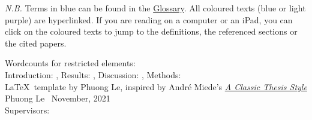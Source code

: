 \thispagestyle{empty}

\textit{N.B.} Terms in blue can be found in the \hyperref[glossary]{Glossary}. All coloured texts (blue or light purple) are hyperlinked. If you are reading on a computer or an iPad, you can click on the coloured texts to jump to the definitions, the referenced sections or the cited papers.

\vfill
\normalsize
Wordcounts for restricted elements:  \\
Introduction: , Results: , Discussion: , Methods:  \\
\LaTeX\ template by 
Phuong Le, inspired by André Miede's \href{https://bitbucket.org/amiede/classicthesis/wiki/Home}{\textit{A Classic Thesis Style}} \\
Phuong Le \textcopyright\ November, 2021 \\
Supervisors: 

\newpage